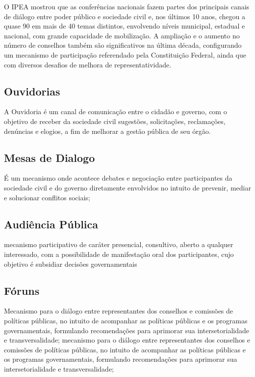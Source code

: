 O IPEA \citeyear{avritzer2012conferencias} mostrou que as conferências nacionais fazem partes dos principais canais de diálogo entre poder público e sociedade civil e, nos últimos 10 anos, chegou a quase 90 em mais de 40 temas distintos, envolvendo níveis municipal, estadual e nacional, com grande capacidade de mobilização. A ampliação e o aumento no número de conselhos também são significativos na última década, configurando um mecanismo de participação referendado pela Constituição Federal, ainda que com diversos desafios de melhora de representatividade. \cite{solagna2014metodologias}

\subsection*{Ouvidorias}

A Ouvidoria é um canal de comunicação entre o cidadão e governo, com o objetivo de receber da sociedade civil sugestões, solicitações, reclamações, denúncias e elogios, a fim de melhorar a gestão pública de seu órgão.

\subsection*{Mesas de Dialogo}

É um mecanismo onde acontece debates e negociação entre participantes da sociedade civil e do governo diretamente envolvidos no intuito de prevenir, mediar e solucionar conflitos sociais;

\subsection*{Audiência Pública}

mecanismo participativo de caráter presencial, consultivo, aberto a qualquer interessado, com a possibilidade de manifestação oral dos participantes, cujo objetivo é subsidiar decisões governamentais

\subsection*{Fóruns}

Mecanismo para o diálogo entre representantes dos conselhos e comissões de políticas públicas, no intuito de acompanhar as políticas públicas e os programas governamentais, formulando recomendações para aprimorar sua intersetorialidade e transversalidade; mecanismo para o diálogo entre representantes dos conselhos e comissões de políticas públicas, no intuito de acompanhar as políticas públicas e os programas governamentais, formulando recomendações para aprimorar sua intersetorialidade e transversalidade;

